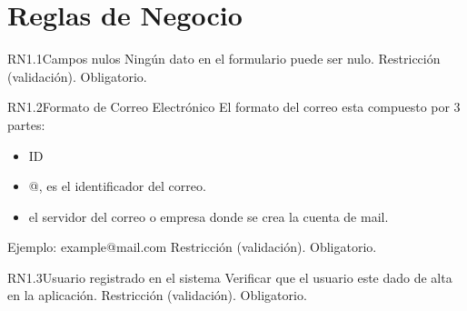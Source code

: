 \section{Reglas de Negocio}

\begin{BussinesRule}{RN1.1}{Campos nulos} 
	\BRitem[Descripción:] Ningún dato en el formulario puede ser nulo.
	\BRitem[Tipo:] Restricción (validación).
	\BRitem[Nivel:] Obligatorio.
\end{BussinesRule}

\begin{BussinesRule}{RN1.2}{Formato de Correo Electrónico} 
	\BRitem[Descripción:] El formato del correo esta compuesto por 3 partes:
		\begin{itemize} 
			\item ID
			\item @, es el identificador del correo.
			\item el servidor del correo o empresa donde se crea la cuenta de mail. 
		\end{itemize}
		Ejemplo: example@mail.com
	\BRitem[Tipo:] Restricción (validación).
	\BRitem[Nivel:] Obligatorio.
\end{BussinesRule}

\begin{BussinesRule}{RN1.3}{Usuario registrado en el sistema} 
	\BRitem[Descripción:] Verificar que el usuario este dado de alta en la aplicación.
	\BRitem[Tipo:] Restricción (validación).
	\BRitem[Nivel:] Obligatorio.
\end{BussinesRule}


